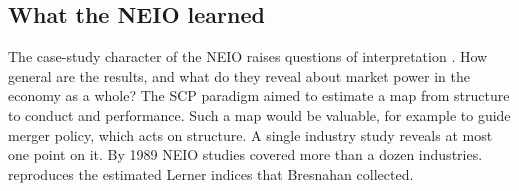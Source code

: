 \subsection{What the NEIO learned}\label{sec:01-neio-lessons}

The case-study character of the NEIO raises questions of interpretation \citep[Section~5]{Bresnahan1989}. How general
are the results, and what do they reveal about market power in the economy as a whole? The SCP paradigm aimed to estimate
a map from structure to conduct and performance. Such a map would be valuable, for example to guide merger policy, which
acts on structure. A single industry study reveals at most one point on it. By 1989 NEIO studies covered more than a
dozen industries.  reproduces the estimated Lerner indices that Bresnahan collected.

